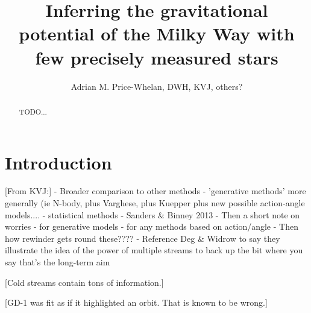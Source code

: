 \documentclass[letterpaper,12pt,preprint]{aastex}
\begin{document}
\title{Inferring the gravitational potential of the Milky Way with few precisely measured stars}
\author{Adrian M. Price-Whelan, DWH, KVJ, others?}

\begin{abstract}
TODO...
\end{abstract}


\section{Introduction}

[From KVJ:]
- Broader comparison to other methods
	- 'generative methods' more generally (ie N-body, plus Varghese, plus Kuepper plus new possible action-angle models....
	- statistical methods
	- Sanders \& Binney 2013
- Then a short note on worries
	- for generative models
	- for any methods based on action/angle 
- Then how rewinder gets round these????
	- Reference Deg \& Widrow to say they illustrate the idea of the power of multiple streams to back up the bit where you say that's the long-term aim

[Cold streams contain tons of information.]

[GD-1 was fit as if it highlighted an orbit.  That is known to be
  wrong.]
\end{document}
